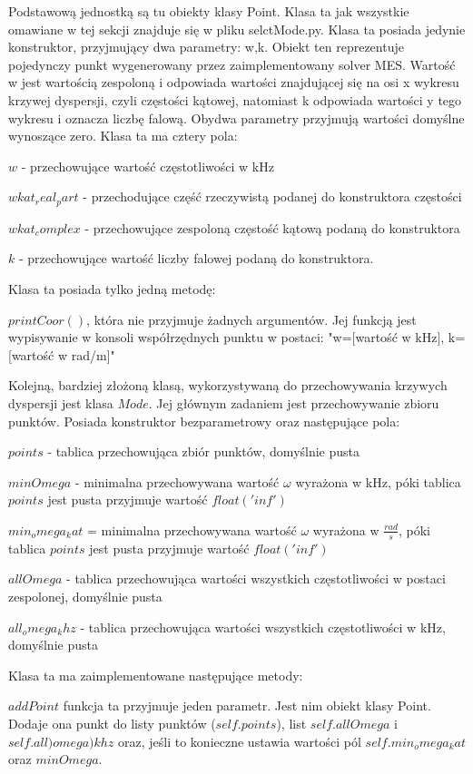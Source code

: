 Podstawową jednostką są tu obiekty klasy Point. Klasa ta jak wszystkie omawiane w tej sekcji znajduje się w pliku selctMode.py. Klasa ta posiada jedynie konstruktor, przyjmujący dwa parametry: w,k. Obiekt ten reprezentuje pojedynczy punkt wygenerowany przez zaimplementowany solver MES. Wartość w jest wartością zespoloną i odpowiada wartości znajdującej się na osi x wykresu krzywej dyspersji, czyli częstości kątowej, natomiast k odpowiada wartości y tego wykresu i oznacza liczbę falową. Obydwa parametry przyjmują wartości domyślne wynoszące zero. Klasa ta ma cztery pola:

$w$ - przechowujące wartość częstotliwości w kHz

$wkat_real_part$ - przechodujące część rzeczywistą podanej do konstruktora częstości

$wkat_complex$ - przechowujące zespoloną częstość kątową podaną do konstruktora

$k$ - przechowujące wartość liczby falowej podaną do konstruktora.

Klasa ta posiada tylko jedną metodę:

$printCoor()$, która nie przyjmuje żadnych argumentów. Jej funkcją jest wypisywanie w konsoli współrzędnych punktu w postaci: "w=[wartość w kHz], k=[wartość w rad/m]"

Kolejną, bardziej złożoną klasą, wykorzystywaną do przechowywania krzywych dyspersji jest klasa $Mode$. Jej głównym zadaniem jest przechowywanie zbioru punktów. Posiada konstruktor bezparametrowy oraz następujące pola:

$points$ - tablica przechowująca zbiór punktów, domyślnie pusta

$minOmega$ - minimalna przechowywana wartość $\omega$ wyrażona w kHz, póki tablica $points$ jest pusta przyjmuje wartość $float('inf')$

$min_omega_kat$ = minimalna przechowywana wartość $\omega$ wyrażona w $\frac{rad}{s}$, póki tablica $points$ jest pusta przyjmuje wartość $float('inf')$

$allOmega$ - tablica przechowująca wartości wszystkich częstotliwości w postaci zespolonej, domyślnie pusta

$all_omega_khz$ - tablica przechowująca wartości wszystkich częstotliwości w kHz, domyślnie pusta

Klasa ta ma zaimplementowane następujące metody:

$addPoint$ funkcja ta przyjmuje jeden parametr. Jest nim obiekt klasy Point. Dodaje ona punkt do listy punktów ($self.points$), list $self.allOmega$ i $self.all)omega)khz$ oraz, jeśli to konieczne ustawia wartości pól $self.min_omega_kat$ oraz $minOmega$.

